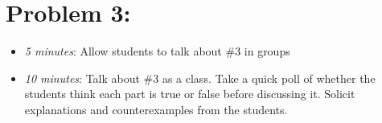 \documentclass[handout,nooutcomes]{ximera}
\begin{document}
	
	
\section*{Problem 3:}

	\begin{itemize}
	
	\item  \emph{5 minutes}:  Allow students to talk about \#3 in groups
	
	\item  \emph{10 minutes}:  Talk about \#3 as a class.  Take a quick poll of whether the students think each part is true or false before discussing it.  Solicit explanations and counterexamples from the students.
	
	\end{itemize}
	
	
	
\end{document}
